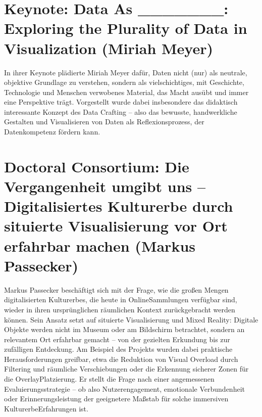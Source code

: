 \documentclass[letterpaper,10pt,english]{jupyterBook}
\begin{document}
\section{Keynote: Data As \_\_\_\_\_\_\_: Exploring the Plurality of Data in Visualization (Miriah Meyer)}
\label{\detokenize{tagung/anderes:keynote-data-as-exploring-the-plurality-of-data-in-visualization-miriah-meyer}}
\sphinxAtStartPar
In ihrer Keynote plädierte Miriah Meyer dafür, Daten nicht (nur) als neutrale, objektive Grundlage zu verstehen, sondern als vielschichtiges, mit Geschichte, Technologie und Menschen verwobenes Material, das Macht ausübt und immer eine Perspektive trägt. Vorgestellt wurde dabei insbesondere das didaktisch interessante Konzept des Data Crafting – also das bewusste, handwerkliche Gestalten und Visualisieren von Daten als Reflexionsprozess, der Datenkompetenz fördern kann.


\section{Doctoral Consortium: Die Vergangenheit umgibt uns – Digitalisiertes Kulturerbe durch situierte Visualisierung vor Ort erfahrbar machen (Markus Passecker)}
\label{\detokenize{tagung/anderes:doctoral-consortium-die-vergangenheit-umgibt-uns-digitalisiertes-kulturerbe-durch-situierte-visualisierung-vor-ort-erfahrbar-machen-markus-passecker}}
\sphinxAtStartPar
Markus Passecker beschäftigt sich mit der Frage, wie die großen Mengen digitalisierten Kulturerbes, die heute in Online\sphinxhyphen{}Sammlungen verfügbar sind, wieder in ihren ursprünglichen räumlichen Kontext zurückgebracht werden können. Sein Ansatz setzt auf situierte Visualisierung und Mixed Reality: Digitale Objekte werden nicht im Museum oder am Bildschirm betrachtet, sondern an relevantem Ort erfahrbar gemacht – von der gezielten Erkundung bis zur zufälligen Entdeckung. Am Beispiel des Projekts  wurden dabei praktische Herausforderungen greifbar, etwa die Reduktion von Visual Overload durch Filtering und räumliche Verschiebungen oder die Erkennung sicherer Zonen für die Overlay\sphinxhyphen{}Platzierung. Er stellt die Frage nach einer angemessenen Evaluierungsstrategie – ob also Nutzerengagement, emotionale Verbundenheit oder Erinnerungsleistung der geeignetere Maßstab für solche immersiven Kulturerbe\sphinxhyphen{}Erfahrungen ist.
\end{document}
